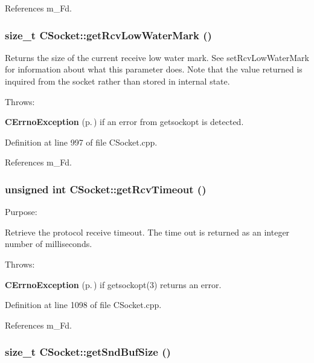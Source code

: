 References m\_\-Fd.
\subsubsection{\setlength{\rightskip}{0pt plus 5cm}size\_\-t CSocket::get\-Rcv\-Low\-Water\-Mark ()}\label{classCSocket_a17}


Returns the size of the current receive low water mark. See set\-Rcv\-Low\-Water\-Mark for information about what this parameter does. Note that the value returned is inquired from the socket rather than stored in internal state.

Throws:\begin{CompactItemize}
\item 
{\bf CErrno\-Exception} {\rm (p.\,\pageref{classCErrnoException})} if an error from getsockopt is detected. \end{CompactItemize}


Definition at line 997 of file CSocket.cpp.

References m\_\-Fd.
\subsubsection{\setlength{\rightskip}{0pt plus 5cm}unsigned int CSocket::get\-Rcv\-Timeout ()}\label{classCSocket_a21}


Purpose:

Retrieve the protocol receive timeout. The time out is returned as an integer number of milliseconds.

Throws:\begin{CompactItemize}
\item 
{\bf CErrno\-Exception} {\rm (p.\,\pageref{classCErrnoException})} if getsockopt(3) returns an error. \end{CompactItemize}


Definition at line 1098 of file CSocket.cpp.

References m\_\-Fd.
\subsubsection{\setlength{\rightskip}{0pt plus 5cm}size\_\-t CSocket::get\-Snd\-Buf\-Size ()}\label{classCSocket_a29}


